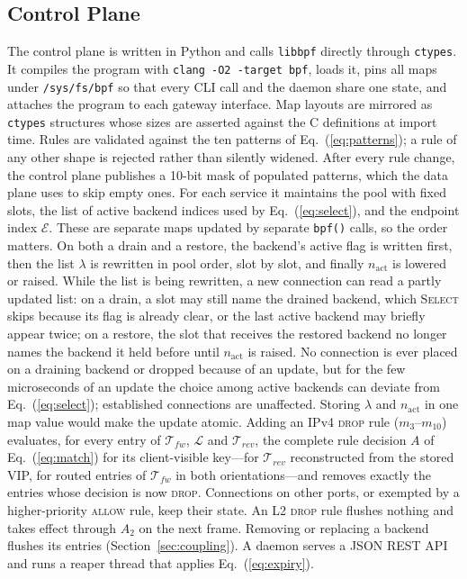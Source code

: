 \documentclass[conference]{IEEEtran}
\begin{document}
\subsection{Control Plane}
\label{sec:control}
The control plane is written in Python and calls \texttt{libbpf} directly
through \texttt{ctypes}. It compiles the program with
\texttt{clang -O2 -target bpf}, loads it, pins all maps under
\texttt{/sys/fs/bpf} so that every CLI call and the daemon share one state,
and attaches the program to each gateway interface. Map layouts are mirrored as
\texttt{ctypes} structures whose sizes are asserted against the C definitions
at import time. Rules are validated against the ten patterns of
Eq.~(\ref{eq:patterns}); a rule of any other shape is rejected rather than
silently widened. After every rule change, the control plane publishes a
10-bit mask of populated patterns, which the data plane uses to skip empty
ones. For each service it maintains the pool with fixed slots, the list of active
backend indices used by Eq.~(\ref{eq:select}), and the endpoint index
$\mathcal{E}$. These are separate maps updated by separate \texttt{bpf()}
calls, so the order matters. On both a drain and a restore, the backend's
active flag is written first, then the list $\lambda$ is rewritten in pool
order, slot by slot, and finally $n_{\mathrm{act}}$ is lowered or raised.
While the list is being rewritten, a new connection can read a partly updated
list: on a drain, a slot may still name the drained backend, which
\textsc{Select} skips because its flag is already clear, or the last active
backend may briefly appear twice; on a restore, the slot that receives the
restored backend no longer names the backend it held before until
$n_{\mathrm{act}}$ is raised. No connection is ever placed on a draining
backend or dropped because of an update, but for the few microseconds of an
update the choice among active backends can deviate from
Eq.~(\ref{eq:select}); established connections are unaffected. Storing
$\lambda$ and $n_{\mathrm{act}}$ in one map value would make the update atomic.
Adding an IPv4 \textsc{drop} rule ($m_3$--$m_{10}$) evaluates, for every entry of
$\mathcal{T}_{fw}$, $\mathcal{L}$ and $\mathcal{T}_{rev}$, the complete rule
decision $A$ of Eq.~(\ref{eq:match}) for its client-visible key---for
$\mathcal{T}_{rev}$ reconstructed from the stored VIP, for routed entries of
$\mathcal{T}_{fw}$ in both orientations---and removes exactly the entries
whose decision is now \textsc{drop}. Connections on other ports, or exempted
by a higher-priority \textsc{allow} rule, keep their state. An L2
\textsc{drop} rule flushes nothing and takes effect through $A_2$ on the
next frame. Removing or replacing a backend flushes its entries
(Section~\ref{sec:coupling}). A daemon serves a JSON REST API and runs a reaper thread
that applies Eq.~(\ref{eq:expiry}).
\end{document}
